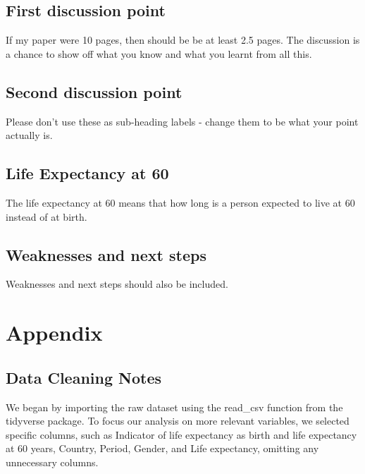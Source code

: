 \documentclass[
  letterpaper,
  DIV=11,
  numbers=noendperiod]{scrartcl}
\begin{document}
\subsection{First discussion point}\label{sec-first-point}

If my paper were 10 pages, then should be be at least 2.5 pages. The
discussion is a chance to show off what you know and what you learnt
from all this.

\subsection{Second discussion point}\label{second-discussion-point}

Please don't use these as sub-heading labels - change them to be what
your point actually is.

\subsection{Life Expectancy at 60}\label{life-expectancy-at-60}

The life expectancy at 60 means that how long is a person expected to
live at 60 instead of at birth.

\subsection{Weaknesses and next steps}\label{weaknesses-and-next-steps}

Weaknesses and next steps should also be included.

\newpage

\appendix

\section{Appendix}\label{sec-appendix}

\subsection{Data Cleaning Notes}\label{data-cleaning-notes}

We began by importing the raw dataset using the read\_csv function from
the tidyverse package. To focus our analysis on more relevant variables,
we selected specific columns, such as Indicator of life expectancy as
birth and life expectancy at 60 years, Country, Period, Gender, and Life
expectancy, omitting any unnecessary columns.
\end{document}
